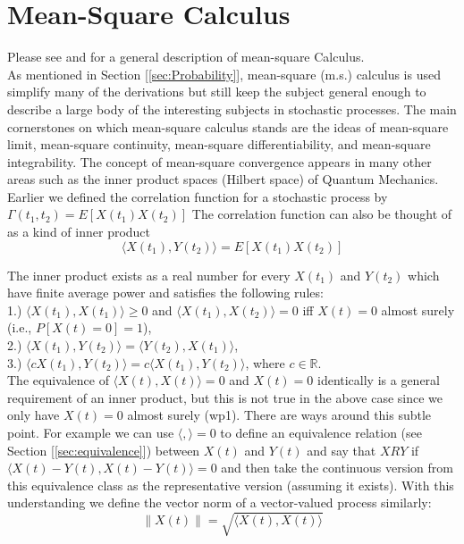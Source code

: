 \section{Mean-Square Calculus}
\label{sec:MeanSquareCalculus}
 
 Please see \cite{Stensby} and \cite{Jazwinski} for a general description of mean-square Calculus. \\
 
 As mentioned in Section [\ref{sec:Probability}], mean-square (m.s.) calculus is used simplify many of the derivations but still keep the subject general enough to describe a large body of the interesting subjects in stochastic processes. The main cornerstones on which mean-square calculus stands are the ideas of {\elevenit mean-square limit, mean-square continuity, mean-square differentiability, and mean-square integrability.} The concept of mean-square convergence appears in many other areas such as the inner product spaces (Hilbert space) of Quantum Mechanics.\\ 
 
Earlier we defined the correlation function for a stochastic process by $\Gamma(t_1, t_2) = E[X(t_1) X(t_2)] $ The correlation function can also be thought of as a kind of inner product 
$$\langle X(t_1), Y(t_2) \rangle = E[X(t_1) X(t_2)]$$

The inner product exists as a real number for every $X(t_1)$ and $Y(t_2)$ which have finite average power and satisfies the following rules:\\

1.) $\langle X(t_1), X(t_1) \rangle \ge 0$ and $\langle X(t_1), X(t_2) \rangle = 0$ iff $X(t) = 0$ almost surely (i.e., $P[X(t) = 0] = 1$),\\ 
2.) $\langle X(t_1), Y(t_2) \rangle = \langle Y(t_2), X(t_1) \rangle $,\\ 
3.) $\langle c X(t_1), Y(t_2) \rangle = c \langle X(t_1), Y(t_2) \rangle$, where $c \in \mathbb{R}$.\\

The equivalence of $\langle X(t), X(t) \rangle = 0$ and $X(t) = 0$ identically is a general requirement of an inner product, but this is not true in the above case since we only have $X(t) = 0$ almost surely (wp1). There are ways around this subtle point. For example we can use $\langle , \rangle = 0$ to define an equivalence relation (see Section [\ref{sec:equivalence}]) between $X(t)$ and $Y(t)$ and say that $X R Y$ if $\langle X(t) - Y(t) , X(t) - Y(t) \rangle = 0$ and then take the continuous version from this equivalence class as the representative version (assuming it exists). With this understanding we define the {\elevenit vector norm} of a vector-valued process similarly:
$$\| X(t) \| = \sqrt{\langle X(t), X(t) \rangle}$$

